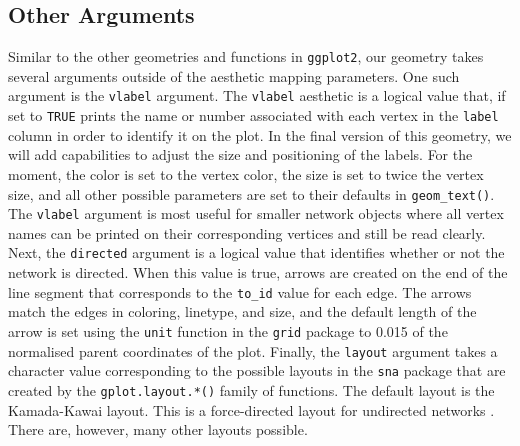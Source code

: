 \documentclass[11pt]{article}\usepackage[]{graphicx}\usepackage[]{color}
\begin{document}
  \subsection{Other Arguments}
  Similar to the other geometries and functions in \texttt{ggplot2}, our geometry takes several arguments outside of the aesthetic mapping parameters.  One such argument is the \texttt{vlabel} argument. The \texttt{vlabel} aesthetic is a logical value that, if set to \texttt{TRUE} prints the name or number associated with each vertex in the \texttt{label} column in order to identify it on the plot.  In the final version of this geometry, we will add capabilities to adjust the size and positioning of the labels. For the moment, the color is set to the vertex color, the size is set to twice the vertex size, and all other possible parameters are set to their defaults in \texttt{geom\_text()}. The \texttt{vlabel} argument is most useful for smaller network objects where all vertex names can be printed on their corresponding vertices and still be read clearly.  Next, the \texttt{directed} argument is a logical value that identifies whether or not the network is directed.  When this value is true, arrows are created on the end of the line segment that corresponds to the \texttt{to\_id} value for each edge.  The arrows match the edges in coloring, linetype, and size, and the default length of the arrow is set using the \texttt{unit} function in the \texttt{grid} package to 0.015 of the normalised parent coordinates of the plot.
  Finally, the \texttt{layout} argument takes a character value corresponding to the possible layouts in the \texttt{sna} package that are created by the \texttt{gplot.layout.*()} family of functions.  The default layout is the Kamada-Kawai layout.  This is a force-directed layout for undirected networks \citep{kamadakawai}. There are, however, many other layouts possible.
\end{document}
